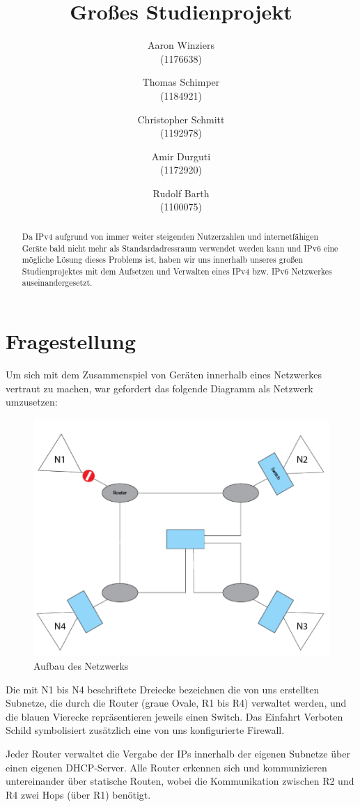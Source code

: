 \documentclass[11pt,a4paper]{article}
\author{Aaron Winziers \\
  (1176638)
  \and
  Thomas Schimper\\
  (1184921)
  \and
  Christopher Schmitt\\
  (1192978)
  \and
  Amir Durguti\\
  (1172920)
  \and
  Rudolf Barth\\
(1100075)
}
\title{Großes Studienprojekt}
\begin{document}
\maketitle
\begin{abstract}
  Da IPv4 aufgrund von immer weiter steigenden Nutzerzahlen
  und internetfähigen Geräte bald nicht mehr als
  Standardadressraum verwendet werden kann und IPv6 eine
  mögliche Lösung dieses Problems ist, haben wir uns innerhalb
  unseres großen Studienprojektes mit dem Aufsetzen und
  Verwalten eines IPv4 bzw. IPv6 Netzwerkes
  auseinandergesetzt.
\end{abstract}
\section{Fragestellung}
Um sich mit dem Zusammenspiel von Geräten innerhalb eines
Netzwerkes vertraut zu machen, war gefordert das folgende
Diagramm als Netzwerk umzusetzen:
\begin{figure}[ht]
  \includegraphics[width=.8\linewidth]{./network_topography.png}
  \centering
  \caption{Aufbau des Netzwerks}
\end{figure}
\par
Die mit N1 bis N4 beschriftete Dreiecke bezeichnen die von uns
erstellten Subnetze, die durch die Router (graue Ovale, R1 bis R4)
verwaltet werden, und die blauen Vierecke repräsentieren jeweils einen
Switch. Das \glqq Einfahrt Verboten\grqq~ Schild symbolisiert
zusätzlich eine von uns konfigurierte Firewall.
\par
Jeder Router verwaltet die Vergabe der IPs innerhalb der eigenen
Subnetze über einen eigenen DHCP-Server. Alle Router erkennen sich und
kommunizieren untereinander über statische Routen, wobei die
Kommunikation zwischen R2 und R4 zwei Hops (über R1) benötigt.
\end{document}
